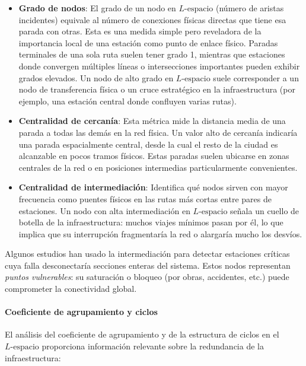             \begin{itemize}
                \item \textbf{Grado de nodos}: El grado de un nodo en $L\text{-espacio}$ (número de aristas incidentes) equivale al número de conexiones físicas directas que tiene esa parada con otras. Esta es una medida simple pero reveladora de la importancia local de una estación como punto de enlace físico. Paradas terminales de una sola ruta suelen tener grado 1, mientras que estaciones donde convergen múltiples líneas o intersecciones importantes pueden exhibir grados elevados. Un nodo de alto grado en $L\text{-espacio}$ suele corresponder a un nodo de transferencia física o un cruce estratégico en la infraestructura (por ejemplo, una estación central donde confluyen varias rutas).

                \item \textbf{Centralidad de cercanía}: Esta métrica mide la distancia media de una parada a todas las demás en la red física. Un valor alto de cercanía indicaría una parada espacialmente central, desde la cual el resto de la ciudad es alcanzable en pocos tramos físicos. Estas paradas suelen ubicarse en zonas centrales de la red o en posiciones intermedias particularmente convenientes.

                \item \textbf{Centralidad de intermediación}: Identifica qué nodos sirven con mayor frecuencia como puentes físicos en las rutas más cortas entre pares de estaciones. Un nodo con alta intermediación en $L\text{-espacio}$ señala un cuello de botella de la infraestructura: muchos viajes mínimos pasan por él, lo que implica que su interrupción fragmentaría la red o alargaría mucho los desvíos.
            \end{itemize}

            Algunos estudios han usado la intermediación para detectar estaciones críticas cuya falla desconectaría secciones enteras del sistema. Estos nodos representan \textit{puntos vulnerables}: su saturación o bloqueo (por obras, accidentes, etc.) puede comprometer la conectividad global. \cite{wang2023, barraza2021}

            \paragraph{Coeficiente de agrupamiento y ciclos}
            El análisis del coeficiente de agrupamiento y de la estructura de ciclos en el $L\text{-espacio}$ proporciona información relevante sobre la redundancia de la infraestructura:


